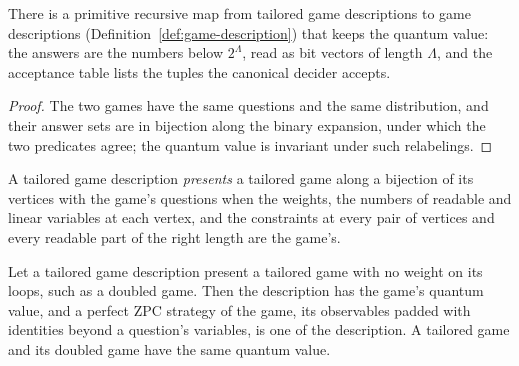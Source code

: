 \begin{lemma}
\label{lem:tailored-conversion}
\leanok
There is a primitive recursive map from tailored game descriptions to game descriptions
(Definition~\ref{def:game-description}) that keeps the quantum value: the answers are the
numbers below $2^\Lambda$, read as bit vectors of length $\Lambda$, and the acceptance table
lists the tuples the canonical decider accepts.
\end{lemma}

\begin{proof}
\leanok
The two games have the same questions and the same distribution, and their answer sets are in
bijection along the binary expansion, under which the two predicates agree; the quantum value is
invariant under such relabelings.
\end{proof}

\begin{definition}[Presentations]
\label{def:tailored-presents}
\leanok
A tailored game description \emph{presents} a tailored game along a bijection of its vertices
with the game's questions when the weights, the numbers of readable and linear variables at each
vertex, and the constraints at every pair of vertices and every readable part of the right
length are the game's.
\end{definition}

\begin{lemma}
\label{lem:tailored-presents}
\leanok
Let a tailored game description present a tailored game with no weight on its loops, such as a
doubled game. Then the description has the game's quantum value, and a perfect ZPC strategy of
the game, its observables padded with identities beyond a question's variables, is one of the
description. A tailored game and its doubled game have the same quantum value.
\end{lemma}

